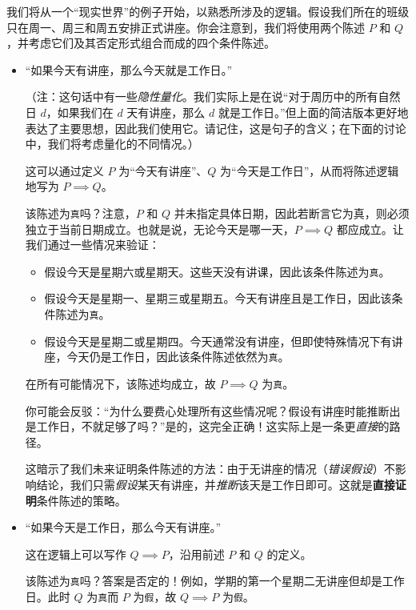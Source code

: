 \begin{example}
    我们将从一个``现实世界''的例子开始，以熟悉所涉及的逻辑。假设我们所在的班级只在周一、周三和周五安排正式讲座。你会注意到，我们将使用两个陈述 $P$ 和 $Q$，并考虑它们及其否定形式组合而成的四个条件陈述。
    \begin{itemize}
        \item ``如果今天有讲座，那么今天就是工作日。''
        
        （注：这句话中有一些\emph{隐性量化}。我们实际上是在说``对于周历中的所有自然日 $d$，如果我们在 $d$ 天有讲座，那么 $d$ 就是工作日。''但上面的简洁版本更好地表达了主要思想，因此我们使用它。请记住，这是句子的含义；在下面的讨论中，我们将考虑量化的不同情况。）

        这可以通过定义 $P$ 为``今天有讲座''、$Q$ 为``今天是工作日''，从而将陈述逻辑地写为 $P \implies Q$。

        该陈述为\verb|真|吗？注意，$P$ 和 $Q$ 并未指定具体日期，因此若断言它为真，则必须独立于当前日期成立。也就是说，无论今天是哪一天，$P \implies Q$ 都应成立。让我们通过一些情况来验证：
        \begin{itemize}[label=--]
            \item 假设今天是星期六或星期天。这些天没有讲课，因此该条件陈述为\verb|真|。
            \item 假设今天是星期一、星期三或星期五。今天有讲座且是工作日，因此该条件陈述为\verb|真|。
            \item 假设今天是星期二或星期四。今天通常没有讲座，但即使特殊情况下有讲座，今天仍是工作日，因此该条件陈述依然为\verb|真|。
        \end{itemize}
        在所有可能情况下，该陈述均成立，故 $P \implies Q$ 为\verb|真|。

        你可能会反驳：``为什么要费心处理所有这些情况呢？假设有讲座时能推断出是工作日，不就足够了吗？''是的，这完全正确！这实际上是一条更\emph{直接}的路径。

        这暗示了我们未来证明条件陈述的方法：由于无讲座的情况（\emph{错误假设}）不影响结论，我们只需\emph{假设}某天有讲座，并\emph{推断}该天是工作日即可。这就是\textbf{直接证明}条件陈述的策略。

        \item ``如果今天是工作日，那么今天有讲座。''
        
            这在逻辑上可以写作 $Q \implies P$，沿用前述 $P$ 和 $Q$ 的定义。

            该陈述为\verb|真|吗？答案是否定的！例如，学期的第一个星期二无讲座但却是工作日。此时 $Q$ 为\verb|真|而 $P$ 为\verb|假|，故 $Q \implies P$ 为\verb|假|。


\end{itemize}
\end{example}
